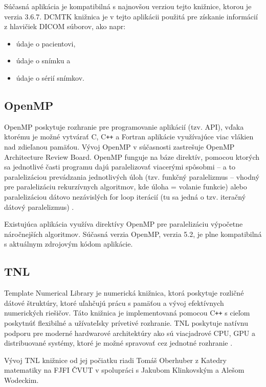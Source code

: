 Súčasná aplikácia je kompatibilná s najnovšou verziou tejto knižnice, ktorou je verzia 3.6.7. DCMTK knižnica je v tejto aplikácii použitá pre získanie informácií z hlavičiek DICOM súborov, ako napr:

\begin{itemize}
\item {údaje o pacientovi,}
\item {údaje o snímku a}
\item {údaje o sérií snímkov.}
\end{itemize}

\subsection {OpenMP}\label{openmp}
OpenMP poskytuje rozhranie pre programovanie aplikácií (tzv. API), vďaka ktorému je možné vytvárať C, C\texttt{++} a Fortran aplikácie využívajúce viac vlákien nad zdieľanou pamäťou. Vývoj OpenMP v súčasnosti zastrešuje OpenMP Architecture Review Board.
OpenMP funguje na báze direktív, pomocou ktorých sa jednotlivé časti programu dajú paralelizovať viacerými spôsobmi -- a to paralelizáciou prevádzania jednotlivých úloh (tzv. funkčný paralelizmus -- vhodný pre paralelizáciu rekurzívnych algoritmov, kde úloha = volanie funkcie) alebo paralelizáciou dátovo nezávislých for loop iterácií (tu sa jedná o tzv. iteračný dátový paralelizmus) \cite{openmp_description}.

Existujúca aplikácia využíva direktívy OpenMP pre paralelizáciu výpočetne náročnejších algoritmov. Súčasná verzia OpenMP, verzia 5.2, je plne kompatibilná s aktuálnym zdrojovým kódom aplikácie.

\subsection {TNL}\label{tnl}
Template Numerical Library je numerická knižnica, ktorá poskytuje rozličné dátové štruktúry, ktoré uľahčujú prácu s pamäťou a vývoj efektívnych numerických riešičov. Táto knižnica je implementovaná pomocou C\texttt{++} s cieľom poskytnúť flexibilné a užívateľsky prívetivé rozhranie. TNL poskytuje natívnu podporu pre moderné hardwarové architektúry ako sú viacjadrové CPU, GPU a distribuované systémy, ktoré je možné spravovať cez jednotné rozhranie \cite{tnl_description}.

Vývoj TNL knižnice od jej počiatku riadi Tomáš Oberhuber z Katedry matematiky na FJFI ČVUT v spolupráci s Jakubom Klinkovským a Alešom Wodeckim.

